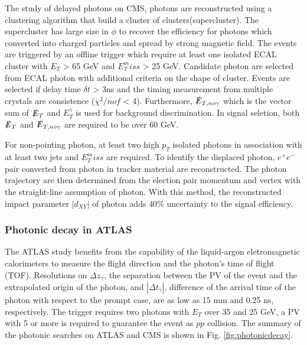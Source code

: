 The study of delayed photons on CMS, photons are reconstructed using a clustering algorithm that build a cluster of clusters(supercluster). The supercluster has large size in $\phi$ to recover the efficiency for photons which converted into charged particles and spread by strong magnetic field. The events are triggered by an offline trigger which require at least one isolated ECAL cluster with $E_T$ > 65 GeV and $E_T^miss$ > 25 GeV. Candidate photon are selected from ECAL photon with additional criteria on the shape of cluster. Events are selected if delay time $\delta t$ > 3ns and the timing measurement from multiple crystals are consistence ($\chi^2/nof$ < 4). Furthermore, $\slashed{E}_{T,no \gamma}$ which is the vector sum of $\slashed{E}_T$ and $E_T^{\gamma}$ is used for background discrimination. In signal seletion, both $\slashed{E}_T$ and $\slashed{E}_{T,no \gamma}$ are required to be over 60 GeV.

For non-pointing photon, at least two high $p_T$ isolated photons in association with at least two jets and $E_T^miss$ are required. To identify the displaced photon, $e^+e^-$ pair converted from photon in tracker material are reconstructed. The photon trajectory are then determined from the election pair momentum and vertex with the straight-line assumption of photon. With this method, the reconstructed impact parameter $|d_{XY}|$ of photon adds $40\%$ uncertainty to the signal efficiency.

\subsubsection{Photonic decay in ATLAS}
The ATLAS study benefits from the capability of the liquid-argon eletromagnetic calorimeters to measure the flight direction and the photon's time of flight (TOF). Resolutions on $\Delta z_{\gamma}$, the separation between the PV of the event and the extrapolated origin of the photon, and $|\Delta t_{\gamma}|$, difference of the arrival time of the photon with respect to the prompt case, are as low as 15 mm and 0.25 ns,
respectively. The trigger requires two photons with $E_T$ over 35 and 25 GeV, a PV with 5 or more is required to guarantee the event as $pp$ collision. The summary of the photonic searches on ATLAS and CMS is shown in Fig. \ref{fig:photonicdecay}.

